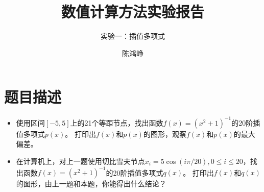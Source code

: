 \documentclass[reportComp]{thesis}
\title{数值计算方法实验报告}
\subtitle{实验一：插值多项式}
\author{陈鸿峥}
\begin{document}
\maketitle

\section{题目描述}
\begin{itemize}
    \item 使用区间$[-5,5]$上的21个等距节点，找出函数$f(x)=(x^2+1)^{-1}$的20阶插值多项式$p(x)$。
    打印出$f(x)$和$p(x)$的图形，观察$f(x)$和$p(x)$的最大偏差。
    \item 在计算机上，对上一题使用切比雪夫节点$x_i=5\cos(i\pi/20),0\leq i\leq 20$，找出函数$f(x)=(x^2+1)^{-1}$的20阶插值多项式$q(x)$。
    打印出$f(x)$和$q(x)$的图形，由上一题和本题，你能得出什么结论？
\end{itemize}
\end{document}
